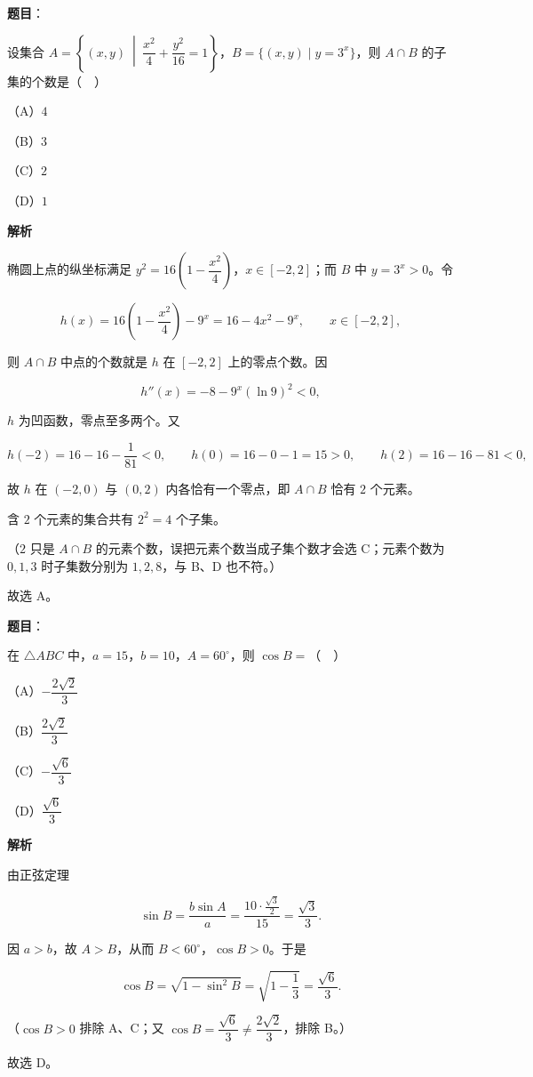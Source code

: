\begin{answer}

\textbf{题目}：

设集合 $A=\left\{(x,y)\ \middle|\ \dfrac{x^2}{4}+\dfrac{y^2}{16}=1\right\}$，$B=\{(x,y)\mid y=3^x\}$，则 $A\cap B$ 的子集的个数是（　）

（A）$4$

（B）$3$

（C）$2$

（D）$1$

\textbf{解析}

椭圆上点的纵坐标满足 $y^2=16\left(1-\dfrac{x^2}{4}\right)$，$x\in[-2,2]$；而 $B$ 中 $y=3^x>0$。令

\nopagebreak[4]
\[h(x)=16\left(1-\frac{x^2}{4}\right)-9^x=16-4x^2-9^x,\qquad x\in[-2,2],\]

则 $A\cap B$ 中点的个数就是 $h$ 在 $[-2,2]$ 上的零点个数。因

\nopagebreak[4]
\[h''(x)=-8-9^x(\ln9)^2<0,\]

$h$ 为凹函数，零点至多两个。又

\nopagebreak[4]
\[h(-2)=16-16-\frac1{81}<0,\qquad h(0)=16-0-1=15>0,\qquad h(2)=16-16-81<0,\]

故 $h$ 在 $(-2,0)$ 与 $(0,2)$ 内各恰有一个零点，即 $A\cap B$ 恰有 $2$ 个元素。

含 $2$ 个元素的集合共有 $2^2=4$ 个子集。

（$2$ 只是 $A\cap B$ 的元素个数，误把元素个数当成子集个数才会选 C；元素个数为 $0,1,3$ 时子集数分别为 $1,2,8$，与 B、D 也不符。）

故选 A。


\end{answer}
\begin{answer}

\textbf{题目}：

在 $\triangle ABC$ 中，$a=15$，$b=10$，$A=60^\circ$，则 $\cos B=$（　）

（A）$-\dfrac{2\sqrt2}{3}$

（B）$\dfrac{2\sqrt2}{3}$

（C）$-\dfrac{\sqrt6}{3}$

（D）$\dfrac{\sqrt6}{3}$

\textbf{解析}

由正弦定理

\nopagebreak[4]
\[\sin B=\frac{b\sin A}{a}=\frac{10\cdot\frac{\sqrt3}{2}}{15}=\frac{\sqrt3}{3}.\]

因 $a>b$，故 $A>B$，从而 $B<60^\circ$，$\cos B>0$。于是

\nopagebreak[4]
\[\cos B=\sqrt{1-\sin^2B}=\sqrt{1-\frac13}=\frac{\sqrt6}{3}.\]

（$\cos B>0$ 排除 A、C；又 $\cos B=\dfrac{\sqrt6}{3}\ne\dfrac{2\sqrt2}{3}$，排除 B。）

故选 D。


\end{answer}
